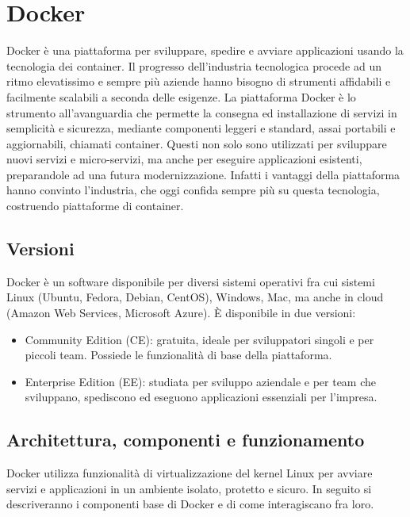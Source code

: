 \chapter{Docker}
\label{Docker}
\thispagestyle{empty}

Docker è una piattaforma per sviluppare, spedire e avviare applicazioni usando la tecnologia dei container. Il progresso dell'industria tecnologica procede ad un ritmo elevatissimo e sempre più aziende hanno bisogno di strumenti affidabili e facilmente scalabili a seconda delle esigenze. La piattaforma Docker è lo strumento all'avanguardia che permette la consegna ed installazione di servizi in semplicità e sicurezza, mediante componenti leggeri e standard, assai portabili e aggiornabili, chiamati container. Questi non solo sono utilizzati per sviluppare nuovi servizi e micro-servizi, ma anche per eseguire applicazioni esistenti, preparandole ad una futura modernizzazione. Infatti i vantaggi della piattaforma hanno convinto l'industria, che oggi confida sempre più su questa tecnologia, costruendo piattaforme di container.

\section{Versioni}
Docker è un software disponibile per diversi sistemi operativi fra cui sistemi Linux (Ubuntu, Fedora, Debian, CentOS), Windows, Mac, ma anche in cloud (Amazon Web Services, Microsoft Azure). È disponibile in due versioni:
\begin{itemize}
    \item Community Edition (CE): gratuita, ideale per sviluppatori singoli e per piccoli team. Possiede le funzionalità di base della piattaforma.
    \item Enterprise Edition (EE): studiata per sviluppo aziendale e per team che sviluppano, spediscono ed eseguono applicazioni essenziali per l'impresa.
\end{itemize}

\section{Architettura, componenti e funzionamento}
Docker utilizza funzionalità di virtualizzazione del kernel Linux per avviare servizi e applicazioni in un ambiente isolato, protetto e sicuro. In seguito si descriveranno i componenti base di Docker e di come interagiscano fra loro.

